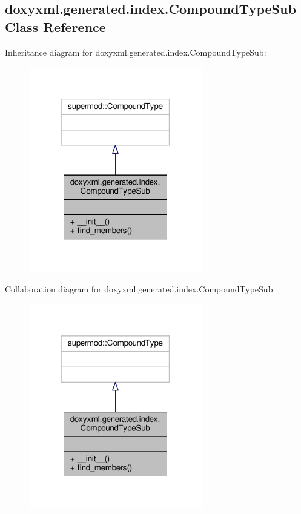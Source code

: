 \subsection{doxyxml.\+generated.\+index.\+Compound\+Type\+Sub Class Reference}
\label{classdoxyxml_1_1generated_1_1index_1_1CompoundTypeSub}


Inheritance diagram for doxyxml.\+generated.\+index.\+Compound\+Type\+Sub\+:
\nopagebreak
\begin{figure}[H]
\begin{center}
\leavevmode
\includegraphics[width=214pt]{db/da8/classdoxyxml_1_1generated_1_1index_1_1CompoundTypeSub__inherit__graph}
\end{center}
\end{figure}


Collaboration diagram for doxyxml.\+generated.\+index.\+Compound\+Type\+Sub\+:
\nopagebreak
\begin{figure}[H]
\begin{center}
\leavevmode
\includegraphics[width=214pt]{d5/dc9/classdoxyxml_1_1generated_1_1index_1_1CompoundTypeSub__coll__graph}
\end{center}
\end{figure}
